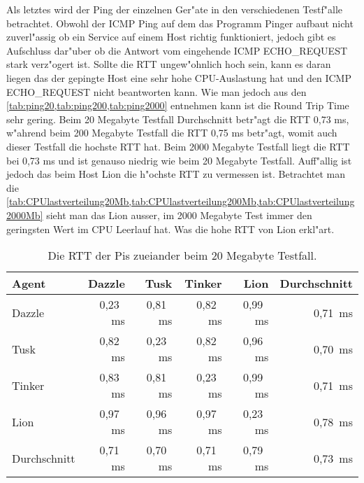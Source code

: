 Als letztes wird der Ping der einzelnen Ger"ate in den verschiedenen Testf"alle betrachtet. %
Obwohl der ICMP Ping auf dem das Programm Pinger aufbaut nicht zuverl"assig ob ein Service %
auf einem Host richtig funktioniert, jedoch gibt es Aufschluss dar"uber ob die Antwort vom eingehende %
ICMP ECHO\_REQUEST stark verz"ogert ist. Sollte die RTT ungew"ohnlich hoch sein, kann es daran liegen %
das der gepingte Host eine sehr hohe CPU-Auslastung hat und den ICMP ECHO\_REQUEST nicht beantworten kann. %
Wie man jedoch aus den \cref{tab:ping20,tab:ping200,tab:ping2000} entnehmen kann ist die Round Trip Time %
sehr gering. Beim 20 Megabyte Testfall Durchschnitt betr"agt die RTT 0,73 ms, w"ahrend beim 200 Megabyte %
Testfall die RTT 0,75 ms betr"agt, womit auch dieser Testfall die hochste RTT hat. Beim 2000 Megabyte Testfall %
liegt die RTT bei 0,73 ms und ist genauso niedrig wie beim 20 Megabyte Testfall. Auff"allig ist jedoch %
das beim Host Lion die h"ochste RTT zu vermessen ist. Betrachtet man die \cref{tab:CPUlastverteilung20Mb,tab:CPUlastverteilung200Mb,tab:CPUlastverteilung2000Mb} %
sieht man das Lion ausser, im 2000 Megabyte Test immer den geringsten Wert im CPU Leerlauf hat. %
Was die hohe RTT von Lion erkl"art. 
  
\begin{table}
\centering
\begin{tabular}{l%
 r<{\,ms}%
 r<{\,ms}%
 r<{\,ms}%
 r<{\,ms}%
 r<{\,ms}%
}
Agent  				& \multicolumn{1}{r}{Dazzle}	& \multicolumn{1}{r}{Tusk}	& \multicolumn{1}{r}{Tinker}	& \multicolumn{1}{r}{Lion}	& \multicolumn{1}{r}{Durchschnitt}		\\
\hline
Dazzle 				& 0,23				& 0,81				& 0,82				& 0,99				& 0,71		\\
Tusk 				& 0,82				& 0,23				& 0,82				& 0,96				& 0,70		\\
Tinker				& 0,83				& 0,81				& 0,23				& 0,99				& 0,71		\\
Lion				& 0,97				& 0,96				& 0,97				& 0,23				& 0,78		\\ 
Durchschnitt			& 0,71				& 0,70				& 0,71 				& 0,79				& 0,73		\\
\end{tabular}
\caption{Die RTT der Pis zueiander beim 20 Megabyte Testfall.}
\label{tab:ping20}
\end{table}

